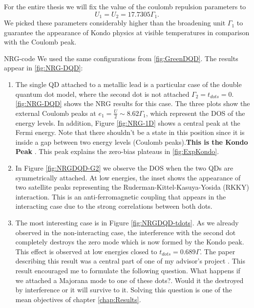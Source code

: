 For the entire thesis we will fix the value of the coulomb repulsion parameters to 
\begin{equation}
 U_1 = U_2 = 17.7305 \Gamma_1.
\end{equation}
\noindent We picked these parameters considerably higher than the broadening unit $\Gamma_1$ to guarantee the appearance of Kondo physics at visible temperatures in comparison with the Coulomb peak.  




 NRG-code  We used the same configurations from \ref{fig:GreenDQD}. The  results appear in \ref{fig:NRG-DQD}:

 \begin{enumerate}
 
\item The single QD attached to a metallic lead is a particular case of the double quantum dot model, where the second dot is not attached $\Gamma_2 = t_{dots}=0$.  \ref{fig:NRG-DQD} shows the NRG results for this case. The three plots show the external Coulomb peaks at $e_1 = \frac{U}{2} \sim 8.62\Gamma_1$, which represent the DOS of the energy levels. In addition,  Figure \ref{fig:NRG-1D} shows a central peak at the Fermi energy. Note that there shouldn't be a state in this position since it is inside a gap between two energy levels (Coulomb peaks).\textbf{This is the Kondo Peak} \cite{hewson_kondo_1997}. This peak explains the zero-bias plateaus in \ref{fig:ExpKondo}.  
\item 
In Figure \ref{fig:NRGDQD-G2} we observe the DOS when the two QDs are symmetrically attached.  At low energies, the inset shows the appearance of two satellite peaks representing the Ruderman-Kittel-Kasuya-Yosida (RKKY) interaction. This is an anti-ferromagnetic coupling that appears in the interacting case due to the strong correlations between both dots. 

\item The most interesting case is in Figure \ref{fig:NRGDQD-tdots}. As we already observed in the non-interacting case, the interference with the second dot completely destroys the zero mode which is now formed by the Kondo peak. This effect is observed at low energies closed to $t_{dots}=0.689\Gamma$. The paper describing this result was a central part of one of my advisor's project \cite{dias_da_silva_transmission_2008}. This result encouraged me to formulate the following question. What happens if we attached a Majorana mode to one of these dots?. Would it the destroyed by interference or it will survive to it. Solving this question is one of the mean objectives of chapter \ref{chap:Results}. 
 \end{enumerate}

